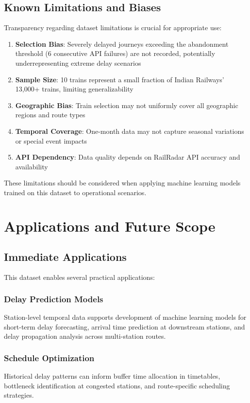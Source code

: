 \documentclass[conference]{IEEEtran}
\begin{document}
\subsection{Known Limitations and Biases}

Transparency regarding dataset limitations is crucial for appropriate use:

\begin{enumerate}
    \item \textbf{Selection Bias}: Severely delayed journeys exceeding the abandonment threshold (6 consecutive API failures) are not recorded, potentially underrepresenting extreme delay scenarios
    \item \textbf{Sample Size}: 10 trains represent a small fraction of Indian Railways' 13,000+ trains, limiting generalizability
    \item \textbf{Geographic Bias}: Train selection may not uniformly cover all geographic regions and route types
    \item \textbf{Temporal Coverage}: One-month data may not capture seasonal variations or special event impacts
    \item \textbf{API Dependency}: Data quality depends on RailRadar API accuracy and availability
\end{enumerate}

These limitations should be considered when applying machine learning models trained on this dataset to operational scenarios.

\section{Applications and Future Scope}

\subsection{Immediate Applications}

This dataset enables several practical applications:

\subsubsection{Delay Prediction Models}
Station-level temporal data supports development of machine learning models for short-term delay forecasting, arrival time prediction at downstream stations, and delay propagation analysis across multi-station routes.

\subsubsection{Schedule Optimization}
Historical delay patterns can inform buffer time allocation in timetables, bottleneck identification at congested stations, and route-specific scheduling strategies.
\end{document}
